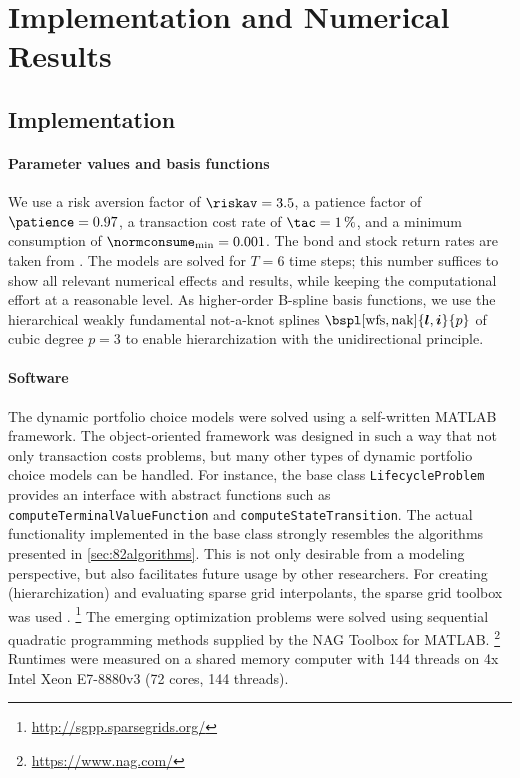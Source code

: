 \section{Implementation and Numerical Results}
\label{sec:84results}


\parbox{1em}{}
\vspace{-3em}



\printornamentsfalse
\subsection{Implementation}
\printornamentstrue

\paragraph{Parameter values and basis functions}

We use
a risk aversion factor of $\riskav = 3.5$,
a patience factor of $\patience = 0.97$,
a transaction cost rate of $\tac = \SI{1}{\percent}$, and
a minimum consumption of $\normconsume_{\min} = 0.001$.
The bond and stock return rates are taken from \cite{Cai10Stable}.
The models are solved for $T = 6$ time steps;
this number suffices to show all relevant numerical effects and results,
while keeping the computational effort at a reasonable level.
As higher-order B-spline basis functions,
we use the hierarchical weakly fundamental not-a-knot splines
$\bspl[\wfs,\nak]{\*l,\*i}{p}$ of cubic degree $p = 3$
to enable hierarchization with the unidirectional principle.

\vspace*{-0.5em}

\paragraph{Software}

The dynamic portfolio choice models were solved using a self-written
MATLAB framework.
The object-oriented framework was designed in such a way that
not only transaction costs problems,
but many other types of dynamic portfolio choice models can be handled.
For instance, the base class \texttt{LifecycleProblem} provides
an interface with abstract functions such as
\texttt{computeTerminalValueFunction} and
\texttt{computeStateTransition}.
The actual functionality implemented in the base class strongly resembles
the algorithms presented in \cref{sec:82algorithms}.
This is not only desirable from a modeling perspective,
but also facilitates future usage by other researchers.
For creating (hierarchization) and evaluating sparse grid interpolants,
the sparse grid toolbox \sgpp was used \cite{Pflueger10Spatially}.%
\footnote{%
  \url{http://sgpp.sparsegrids.org/}%
}
The emerging optimization problems were solved using
sequential quadratic programming methods supplied by the
NAG Toolbox for MATLAB.%
\footnote{%
  \url{https://www.nag.com/}%
}
Runtimes were measured on a shared memory computer
with 144 threads on 4x Intel Xeon E7-8880v3 (72 cores, 144 threads).



